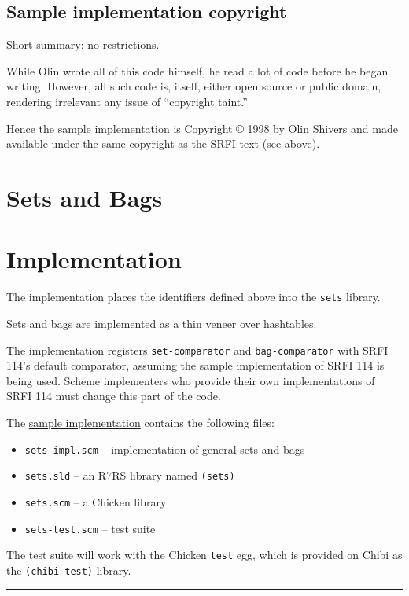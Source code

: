 \subsection{Sample implementation
copyright}\label{Sampleimplementationcopyright}

Short summary: no restrictions.

While Olin wrote all of this code himself, he read a lot of code before
he began writing. However, all such code is, itself, either open source
or public domain, rendering irrelevant any issue of ``copyright taint.''

Hence the sample implementation is Copyright © 1998 by Olin Shivers and
made available under the same copyright as the SRFI text (see above).

\section{Sets and Bags}
\section{Implementation}\label{implementation}

The implementation places the identifiers defined above into the
\texttt{sets} library.

Sets and bags are implemented as a thin veneer over hashtables.

The implementation registers \texttt{set-comparator} and
\texttt{bag-comparator} with SRFI 114's default comparator, assuming the
sample implementation of SRFI 114 is being used. Scheme implementers who
provide their own implementations of SRFI 114 must change this part of
the code.

The \href{http://srfi.schemers.org/srfi-113/sets.tar.gz}{sample
implementation} contains the following files:

\begin{itemize}
\tightlist
\item
  \texttt{sets-impl.scm} -- implementation of general sets and bags
\item
  \texttt{sets.sld} -- an R7RS library named \texttt{(sets)}
\item
  \texttt{sets.scm} -- a Chicken library
\item
  \texttt{sets-test.scm} -- test suite
\end{itemize}

The test suite will work with the Chicken \texttt{test} egg, which is
provided on Chibi as the \texttt{(chibi\ test)} library.
\begin{center}\rule{0.5\linewidth}{\linethickness}\end{center}

